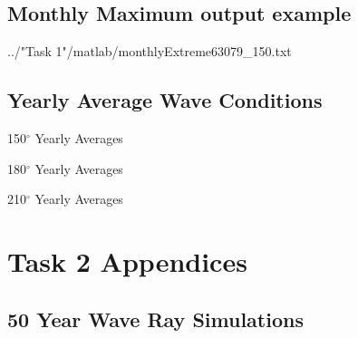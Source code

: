 \documentclass[10pt,letterpaper,titlepage]{report}
\begin{document}
\begin{appendices}
\section{Monthly Maximum output example}
 {../"Task 1"/matlab/monthlyExtreme63079_150.txt}

\section{Yearly Average Wave Conditions}

\begin{minipage}{0.36\textwidth}
\begin{table}[H]
	
	\label{yearly150}
	\caption{150$^\circ$ Yearly Averages}
\end{table}
\end{minipage}
\begin{minipage}{0.36\textwidth}
\begin{table}[H]
	
	\label{yearly180}
	\caption{180$^\circ$ Yearly Averages}
\end{table}
\end{minipage}
\begin{minipage}{0.36\textwidth}
\begin{table}[H]
	
	\label{yearly210}
	\caption{210$^\circ$ Yearly Averages}
\end{table}
\end{minipage}

\chapter{Task 2 Appendices}

\section{50 Year Wave Ray Simulations}


\end{appendices}
\end{document}
